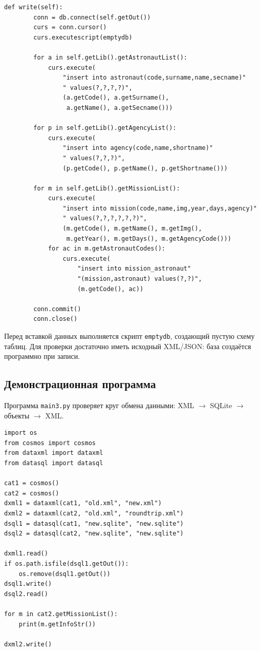\documentclass[a4paper,14pt]{extarticle}
\begin{document}
\begin{lstlisting}[caption={Модуль \texttt{datasql.py}: метод \texttt{write()}}]
    def write(self):
        conn = db.connect(self.getOut())
        curs = conn.cursor()
        curs.executescript(emptydb)

        for a in self.getLib().getAstronautList():
            curs.execute(
                "insert into astronaut(code,surname,name,secname)"
                " values(?,?,?,?)",
                (a.getCode(), a.getSurname(),
                 a.getName(), a.getSecname()))

        for p in self.getLib().getAgencyList():
            curs.execute(
                "insert into agency(code,name,shortname)"
                " values(?,?,?)",
                (p.getCode(), p.getName(), p.getShortname()))

        for m in self.getLib().getMissionList():
            curs.execute(
                "insert into mission(code,name,img,year,days,agency)"
                " values(?,?,?,?,?,?)",
                (m.getCode(), m.getName(), m.getImg(),
                 m.getYear(), m.getDays(), m.getAgencyCode()))
            for ac in m.getAstronautCodes():
                curs.execute(
                    "insert into mission_astronaut"
                    "(mission,astronaut) values(?,?)",
                    (m.getCode(), ac))

        conn.commit()
        conn.close()
\end{lstlisting}

Перед вставкой данных выполняется скрипт \texttt{emptydb}, создающий пустую схему таблиц. Для проверки достаточно иметь исходный XML/JSON: база создаётся программно при записи.

\subsection{Демонстрационная программа}

Программа \texttt{main3.py} проверяет круг обмена данными: XML $\to$ SQLite $\to$ объекты $\to$ XML.

\begin{lstlisting}[caption={Модуль \texttt{main3.py}}]
import os
from cosmos import cosmos
from dataxml import dataxml
from datasql import datasql

cat1 = cosmos()
cat2 = cosmos()
dxml1 = dataxml(cat1, "old.xml", "new.xml")
dxml2 = dataxml(cat2, "old.xml", "roundtrip.xml")
dsql1 = datasql(cat1, "new.sqlite", "new.sqlite")
dsql2 = datasql(cat2, "new.sqlite", "new.sqlite")

dxml1.read()
if os.path.isfile(dsql1.getOut()):
    os.remove(dsql1.getOut())
dsql1.write()
dsql2.read()

for m in cat2.getMissionList():
    print(m.getInfoStr())

dxml2.write()
\end{lstlisting}
\end{document}
